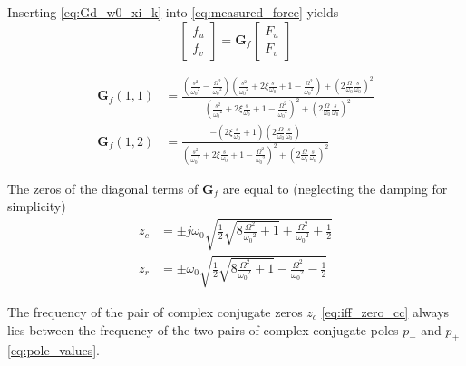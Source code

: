 \documentclass[10pt]{iopart}
\begin{document}
Inserting \eqref{eq:Gd_w0_xi_k} into \eqref{eq:measured_force} yields
\begin{equation}
\label{eq:Gf_mimo_tf}
  \begin{bmatrix} f_{u} \\ f_{v} \end{bmatrix} = \mathbf{G}_{f} \begin{bmatrix} F_u \\ F_v \end{bmatrix}
\end{equation}

\begin{subequations}
\label{eq:Gf}
  \begin{align}
    \mathbf{G}_{f}(1,1) &= {\scriptstyle \frac{\left( \frac{s^2}{{\omega_0}^2} - \frac{\Omega^2}{{\omega_0}^2} \right) \left( \frac{s^2}{{\omega_0}^2} + 2 \xi \frac{s}{\omega_0} + 1 - \frac{{\Omega}^2}{{\omega_0}^2} \right) + \left( 2 \frac{\Omega}{\omega_0} \frac{s}{\omega_0} \right)^2}{\left( \frac{s^2}{{\omega_0}^2} + 2 \xi \frac{s}{\omega_0} + 1 - \frac{{\Omega}^2}{{\omega_0}^2} \right)^2 + \left( 2 \frac{\Omega}{\omega_0} \frac{s}{\omega_0} \right)^2} } \\
    \mathbf{G}_{f}(1,2) &= {\scriptstyle \frac{- \left( 2 \xi \frac{s}{\omega_0} + 1 \right) \left( 2 \frac{\Omega}{\omega_0} \frac{s}{\omega_0} \right)}{\left( \frac{s^2}{{\omega_0}^2} + 2 \xi \frac{s}{\omega_0} + 1 - \frac{{\Omega}^2}{{\omega_0}^2} \right)^2 + \left( 2 \frac{\Omega}{\omega_0} \frac{s}{\omega_0} \right)^2} }
  \end{align}
\end{subequations}

The zeros of the diagonal terms of \(\mathbf{G}_f\) are equal to (neglecting the damping for simplicity)
\begin{subequations}
  \begin{align}
    z_c &= \pm j \omega_0 \sqrt{\frac{1}{2} \sqrt{8 \frac{\Omega^2}{{\omega_0}^2} + 1} + \frac{\Omega^2}{{\omega_0}^2} + \frac{1}{2} } \label{eq:iff_zero_cc} \\
    z_r &= \pm   \omega_0 \sqrt{\frac{1}{2} \sqrt{8 \frac{\Omega^2}{{\omega_0}^2} + 1} - \frac{\Omega^2}{{\omega_0}^2} - \frac{1}{2} } \label{eq:iff_zero_real}
  \end{align}
\end{subequations}

The frequency of the pair of complex conjugate zeros \(z_c\) \eqref{eq:iff_zero_cc} always lies between the frequency of the two pairs of complex conjugate poles \(p_{-}\) and \(p_{+}\) \eqref{eq:pole_values}.
\end{document}

